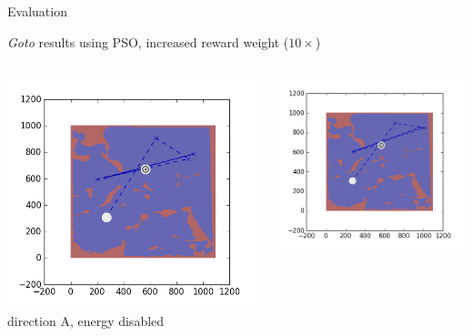 \documentclass[9pt]{beamer}
\begin{document}
\begin{frame}{Evaluation}
\begin{block}{\textit{Goto} results using PSO, increased reward weight ($10\times$)}
\begin{columns}
\begin{column}{0.25\textwidth}
\begin{center}
                    \includegraphics[width=\textwidth,trim={2cm 2cm 2cm 2cm},clip]{img/EXP3RG_PathAa_-1_-1_0_0d01.png}
                    \newline
                    \tiny{direction A, energy disabled}
                \end{center}
            \end{column}
            \begin{column}{0.25\textwidth}
                \begin{center}
                    \includegraphics[width=\textwidth,trim={2cm 2cm 2cm 2cm},clip]{img/EXP3RG_PathAa_-1_-1_-1_0d01.png}

\end{center}
\end{column}
\end{columns}
\end{block}
\end{frame}
\end{document}
